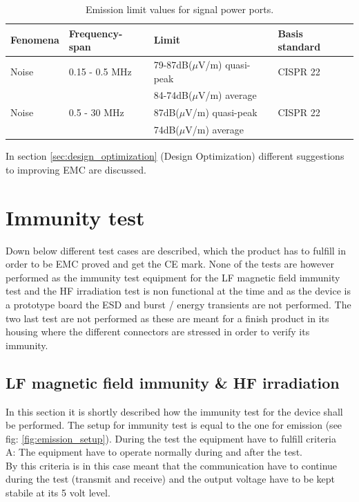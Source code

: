 \begin{table}[H]
		\begin{center}
		\begin{tabular}{|l|l|l|l|}\hline
			Fenomena 	& Frequency-span & Limit & Basis standard\\\hline
			Noise		& 0.15 - 0.5 MHz		& 79-87dB($\mu$V/m) quasi-peak	& CISPR 22	\\
			~ 			& ~					& 84-74dB($\mu$V/m) average	& ~		\\\hline
			Noise		& 0.5 - 30 MHz			& 87dB($\mu$V/m) quasi-peak		& CISPR 22	\\
			~ 			& ~					& 74dB($\mu$V/m) average		& 		\\\hline
		\end{tabular}
		\end{center}
	\caption{Emission limit  values for signal power ports.}
	\label{table:emission_standard_SIGNAL}
\end{table}

In section \ref{sec:design_optimization} (Design Optimization) different suggestions to improving EMC are discussed.

\section{Immunity test}
Down below different test cases are described, which the product has to fulfill in order to be EMC proved and get the CE mark. None of the tests are however performed as the immunity test equipment for the LF magnetic field immunity test and the HF irradiation test is non functional at the time and as the device is a prototype board the ESD and burst / energy transients are not performed. The two last test are not performed as these are meant for a finish product in its housing where the different connectors are stressed in order to verify its immunity. 

\subsection{LF magnetic field immunity \& HF irradiation}
In this section it is shortly described how the immunity test for the device shall be performed.
\p The setup for immunity test is equal to the one for emission (see fig: \ref{fig:emission_setup}). During the test the equipment have to fulfill criteria \\A: The equipment have to operate normally during and after the test. \\ By this criteria is in this case meant that the communication have to continue during the test (transmit and receive) and the output voltage have to be kept stabile at its 5 volt level.


